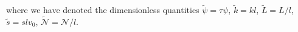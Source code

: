 \documentclass[pre,aps,superscriptaddress,nofootinbib]{revtex4}
\begin{document}
where we have denoted the dimensionless quantities $\tilde{\psi} = \tau \psi$, $\tilde{k} = k l$, $\tilde{L} = L/l$, $\tilde{s} = s l v_0$, $\tilde{\mathcal{N}} = \mathcal{N}/l$.
%
\end{document}
